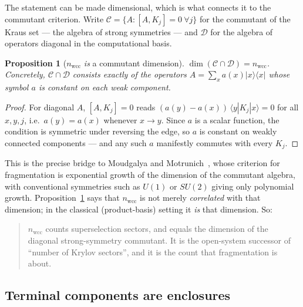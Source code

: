 \documentclass[11pt]{article}
\theoremstyle{plain}
\newtheorem{proposition}{Proposition}
\theoremstyle{definition}
\theoremstyle{remark}
\begin{document}
The statement can be made dimensional, which is what connects it to the
commutant criterion. Write $\mathcal{C} = \{A : [A,K_j] = 0 \ \forall j\}$ for
the commutant of the Kraus set --- the algebra of strong symmetries --- and
$\mathcal{D}$ for the algebra of operators diagonal in the computational basis.

\begin{proposition}[$n_{\mathrm{wcc}}$ \emph{is} a commutant dimension]
\label{prop:dim}
$\dim (\mathcal{C} \cap \mathcal{D}) = n_{\mathrm{wcc}}$. Concretely,
$\mathcal{C} \cap \mathcal{D}$ consists exactly of the operators
$A = \sum_x a(x)|x\rangle\langle x|$ whose symbol $a$ is constant on each weak
component.
\end{proposition}

\begin{proof}
For diagonal $A$, $[A,K_j] = 0$ reads
$(a(y) - a(x))\,\langle y|K_j|x\rangle = 0$ for all $x,y,j$, i.e.\ $a(y) = a(x)$
whenever $x \to y$. Since $a$ is a scalar function, the condition is symmetric
under reversing the edge, so $a$ is constant on weakly connected components ---
and any such $a$ manifestly commutes with every $K_j$.
\end{proof}

This is the precise bridge to Moudgalya and Motrunich~\cite{mm2022}, whose
criterion for fragmentation is exponential growth of the dimension of the
commutant algebra, with conventional symmetries such as $U(1)$ or $SU(2)$
giving only polynomial growth. Proposition~\ref{prop:dim} says that
$n_{\mathrm{wcc}}$ is not merely \emph{correlated} with that dimension; in the
classical (product-basis) setting it \emph{is} that dimension. So:

\begin{quote}
$n_{\mathrm{wcc}}$ counts superselection sectors, and equals the dimension of
the diagonal strong-symmetry commutant. It is the open-system successor of
``number of Krylov sectors'', and it is the count that fragmentation is about.
\end{quote}

\subsection{Terminal components are enclosures}
\end{document}
